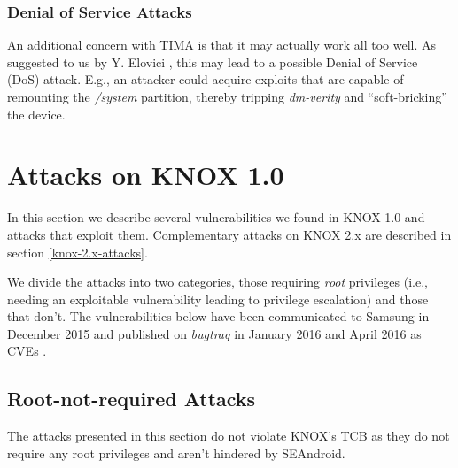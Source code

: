 \documentclass[11pt]{article}
\begin{document}
\subsubsection{Denial of Service Attacks}
An additional concern with TIMA is that it may actually work all too well. As suggested to us by Y. Elovici \cite{TIMADosAttack}, 
this may lead to a possible Denial of Service (DoS) attack. E.g.,
an attacker could acquire exploits that are capable of remounting the \emph{/system} partition, thereby tripping \emph{dm-verity} 
and ``soft-bricking'' the device.

\section{Attacks on KNOX 1.0} \label{knox-1.0-attacks}
In this section we describe several vulnerabilities we found in KNOX 1.0 and attacks that exploit them.
Complementary attacks on KNOX 2.x are described in section \ref{knox-2.x-attacks}.

We divide the attacks into two categories, those requiring \emph{root} privileges 
(i.e., needing an exploitable vulnerability leading to privilege escalation) and those that don't. 
The vulnerabilities below have been communicated to Samsung in December 2015 \cite{SamsungCorrespondence} and 
published on \emph{bugtraq} \cite{bugtraq} in January 2016 and April 2016 as CVEs \cite{CVE-2016-1919, CVE-2016-1920, CVE-2016-3996}.

\subsection{Root-not-required Attacks} 
The attacks presented in this section do not violate KNOX's TCB as they do not require any root privileges and aren't hindered by SEAndroid.
\end{document}

